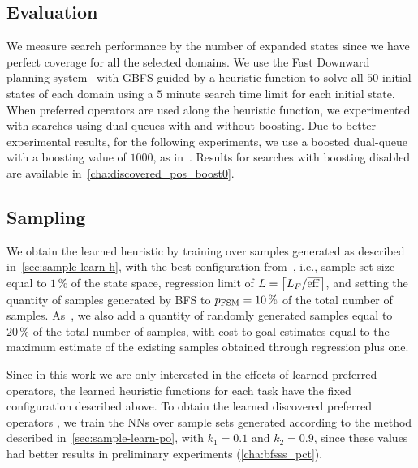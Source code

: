\documentclass[ppgc,diss,english]{iiufrgs}
\providecommand{\ceil}[1]{\ensuremath{\left\lceil #1\right\rceil}}
\begin{document}
\subsection{Evaluation}
\label{sec:exp-evaluation}
We measure search performance by the number of expanded states since we have perfect coverage for all the selected domains. We use the Fast Downward planning system~\cite{Helmert/2006} with GBFS guided by a heuristic function to solve all $50$ initial states of each domain using a $5$ minute search time limit for each initial state.
When preferred operators are used along the heuristic function, we experimented with searches using dual-queues with and without boosting. Due to better experimental results, for the following experiments, we use a boosted dual-queue with a boosting value of $1000$, as in~\citet{Richter.Helmert/2009}. Results for searches with boosting disabled are available in~\vref{cha:discovered_pos_boost0}.

\subsection{Sampling}
\label{sec:exp-sampling}
We obtain the learned heuristic \hnn by training over samples generated as described in~\cref{sec:sample-learn-h}, with the best configuration from~\citet{Bettker.etal/2022}, i.e., sample set size equal to $1\,\%$ of the state space, regression limit of $L=\ceil{\facts/\overline{\eff}}$, and setting the quantity of samples generated by BFS to $p_{\text{FSM}}=10\,\%$ of the total number of samples. As~\citet{Bettker.etal/2022}, we also add a quantity of randomly generated samples equal to $20\,\%$ of the total number of samples, with cost-to-goal estimates equal to the maximum estimate of the existing samples obtained through regression plus one.

Since in this work we are only interested in the effects of learned preferred operators, the learned heuristic functions \hnn for each task have the fixed configuration described above. To obtain the learned discovered preferred operators \pog, we train the NNs over sample sets generated according to the method described in~\cref{sec:sample-learn-po}, with $k_1 = 0.1$ and $k_2 = 0.9$, since these values had better results in preliminary experiments (\vref{cha:bfsss_pct}).
\end{document}
